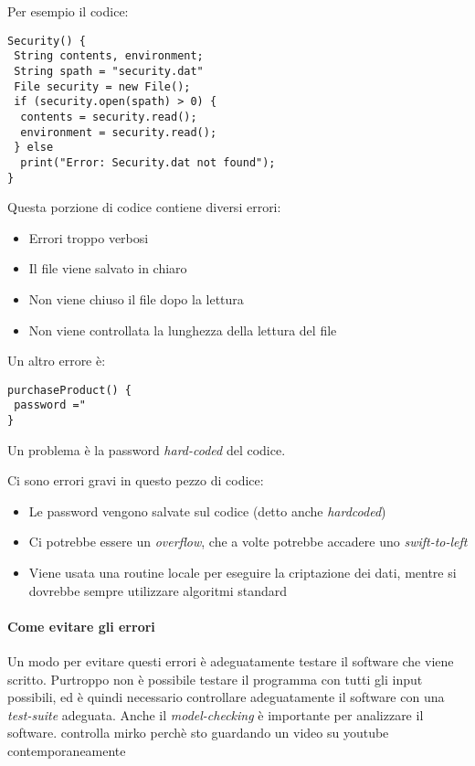 Per esempio il codice:
\begin{verbatim}
Security() {
 String contents, environment;
 String spath = "security.dat"
 File security = new File();
 if (security.open(spath) > 0) {
  contents = security.read();
  environment = security.read();
 } else
  print("Error: Security.dat not found");
}
\end{verbatim}

Questa porzione di codice contiene diversi errori:
\begin{itemize}
\item Errori troppo verbosi
\item Il file viene salvato in chiaro
\item Non viene chiuso il file dopo la lettura
\item Non viene controllata la lunghezza della lettura del file
\end{itemize}

Un altro errore è:
\begin{verbatim}
purchaseProduct() {
 password ="
}
\end{verbatim}
Un problema è la password \emph{hard-coded} del codice.

Ci sono errori gravi in questo pezzo di codice:
\begin{itemize}
\item Le password vengono salvate sul codice (detto anche \textit{hardcoded})
\item Ci potrebbe essere un \textit{overflow}, che a volte potrebbe accadere uno 
\textit{swift-to-left} %
\item Viene usata una routine locale per eseguire la criptazione dei dati, 
mentre si dovrebbe sempre utilizzare algoritmi standard
\end{itemize}


\paragraph*{Come evitare gli errori} Un modo per evitare questi errori è 
adeguatamente testare il software che viene scritto. Purtroppo non è possibile 
testare il programma con tutti gli input possibili, ed è quindi necessario 
controllare adeguatamente il software con una \textit{test-suite} adeguata. 
Anche il \textit{model-checking} è importante per analizzare il software. %
controlla mirko perchè sto guardando un video su youtube contemporaneamente



